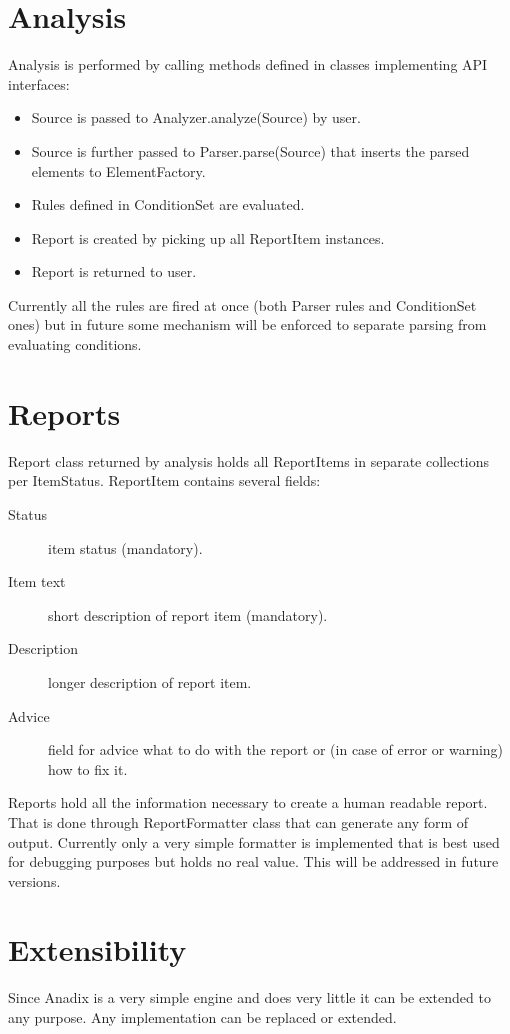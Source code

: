 \documentclass{report}
\begin{document}
\section{Analysis}
Analysis is performed by calling methods defined in classes implementing API
interfaces:
\begin{itemize}
  \item Source is passed to Analyzer.analyze(Source) by user.
  \item Source is further passed to Parser.parse(Source) that inserts the parsed
  elements to ElementFactory.
  \item Rules defined in ConditionSet are evaluated.
  \item Report is created by picking up all ReportItem instances.
  \item Report is returned to user.
\end{itemize}
Currently all the rules are fired at once (both Parser rules and ConditionSet
ones) but in future some mechanism will be enforced to separate parsing from
evaluating conditions.

\section{Reports}
Report class returned by analysis holds all ReportItems in separate collections
per ItemStatus. ReportItem contains several fields:
\begin{description}
  \item[Status] item status (mandatory).
  \item[Item text] short description of report item (mandatory).
  \item[Description] longer description of report item.
  \item[Advice] field for advice what to do with the report or (in case of
  error or warning) how to fix it.
\end{description}
Reports hold all the information necessary to create a human readable report.
That is done through ReportFormatter class that can generate any form of output.
Currently only a very simple formatter is implemented that is best used for
debugging purposes but holds no real value. This will be addressed in future
versions.

\section{Extensibility}
Since Anadix is a very simple engine and does very little it can be extended to
any purpose. Any implementation can be replaced or extended.
\end{document}
